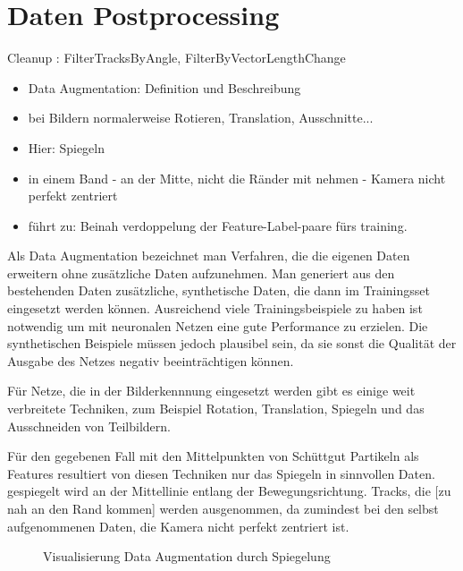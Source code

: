 


\section{Daten Postprocessing}

Cleanup : FilterTracksByAngle, FilterByVectorLengthChange 


\begin{itemize}
	\item Data Augmentation: Definition und Beschreibung
	\item bei Bildern normalerweise Rotieren, Translation, Ausschnitte...
	\item Hier: Spiegeln
	\item in einem Band - an der Mitte, nicht die Ränder mit nehmen - Kamera nicht perfekt zentriert
	\item führt zu: Beinah verdoppelung der Feature-Label-paare fürs training.
\end{itemize}

\color{blue}
Als Data Augmentation bezeichnet man Verfahren, die die eigenen Daten erweitern ohne zusätzliche Daten aufzunehmen.
Man generiert aus den bestehenden Daten zusätzliche, synthetische Daten, die dann im Trainingsset eingesetzt werden können.
Ausreichend viele Trainingsbeispiele zu haben ist notwendig um mit neuronalen Netzen eine gute Performance zu erzielen.
Die synthetischen Beispiele müssen jedoch plausibel sein, da sie sonst die Qualität der Ausgabe des Netzes negativ beeinträchtigen können.

Für Netze, die in der Bilderkennnung eingesetzt werden gibt es einige weit verbreitete Techniken,
zum Beispiel Rotation, Translation, Spiegeln und das Ausschneiden von Teilbildern.

Für den gegebenen Fall mit den Mittelpunkten von Schüttgut Partikeln als Features resultiert von diesen Techniken nur das Spiegeln in sinnvollen Daten.
gespiegelt wird an der Mittellinie entlang der Bewegungsrichtung.
Tracks, die [zu nah an den Rand kommen] werden ausgenommen, da zumindest bei den selbst aufgenommenen Daten, die Kamera nicht perfekt zentriert ist.

\begin{figure}
	\caption{Visualisierung Data Augmentation durch Spiegelung}
	\label{fig:dataAugm}
\end{figure}


